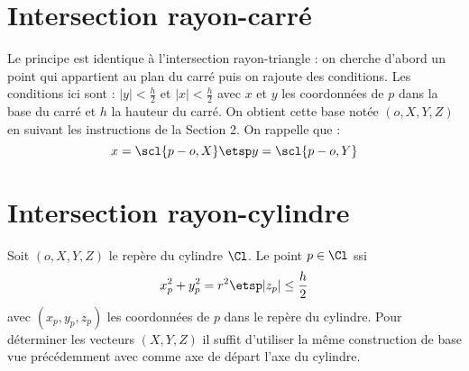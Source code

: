 \dd\dd\section{Intersection rayon-carré}
\ni Le principe est identique à l'intersection rayon-triangle : on cherche 
d'abord un point qui appartient au plan du carré puis on rajoute
des conditions. Les conditions ici sont : $|y| < \frac h 2$ et $|x|<
\frac h 2$ avec $x$ et $y$ les coordonnées de $p$ dans la base du carré et $h$
la hauteur du carré. On obtient cette base notée $(o,X,Y,Z)$ en suivant les instructions de la
Section 2. On rappelle que :
$$x = \scl{p - o, X} \etsp y = \scl{p - o, Y}$$

\newpage\section{Intersection rayon-cylindre}
\ni Soit $(o,X,Y,Z)$ le repère du cylindre $\Cl$. Le point $p\in\Cl$ ssi
$$x_p^2 + y_p^2 = r^2\etsp|z_p|\leq\frac h 2$$
\ni avec $(x_p,y_p,z_p)$ les coordonnées de $p$ dans le repère du
cylindre. Pour déterminer les vecteurs $(X,Y,Z)$ il suffit d'utiliser la même
construction de base vue précédemment avec comme axe de départ l'axe du cylindre.

